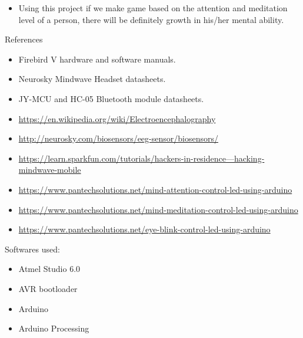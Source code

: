 \documentclass[14pt]{article}
\begin{document}
\begin{itemize}
	\item Using this project if we make game based on the attention and meditation level of a person, there will be definitely growth in his/her mental ability.
\end{itemize}

\break

\begin{center}
{\Huge References}
\end{center}

\begin{itemize}
	\item Firebird V hardware and software manuals.
	\item Neurosky Mindwave Headset datasheets.
	\item JY-MCU and HC-05 Bluetooth module datasheets.
	\item \href{https://en.wikipedia.org/wiki/Electroencephalography}{https://en.wikipedia.org/wiki/Electroencephalography}
	\item \href{http://neurosky.com/biosensors/eeg-sensor/biosensors/}{http://neurosky.com/biosensors/eeg-sensor/biosensors/}
	\item \href{https://learn.sparkfun.com/tutorials/hackers-in-residence---hacking-mindwave-mobile}{https://learn.sparkfun.com/tutorials/hackers-in-residence---hacking-mindwave-mobile}
	\item \href{https://www.pantechsolutions.net/mind-attention-control-led-using-arduino}{https://www.pantechsolutions.net/mind-attention-control-led-using-arduino}
	\item \href{https://www.pantechsolutions.net/mind-meditation-control-led-using-arduino}{https://www.pantechsolutions.net/mind-meditation-control-led-using-arduino}
	\item \href{https://www.pantechsolutions.net/eye-blink-control-led-using-arduino}{https://www.pantechsolutions.net/eye-blink-control-led-using-arduino}
\end{itemize}
\hspace{15pt}

\begin{center}
	{\Huge Softwares used:}
\end{center}
\begin{itemize}
	\item Atmel Studio 6.0
	\item AVR bootloader
	\item Arduino
	\item Arduino Processing
\end{itemize}
\end{document}
